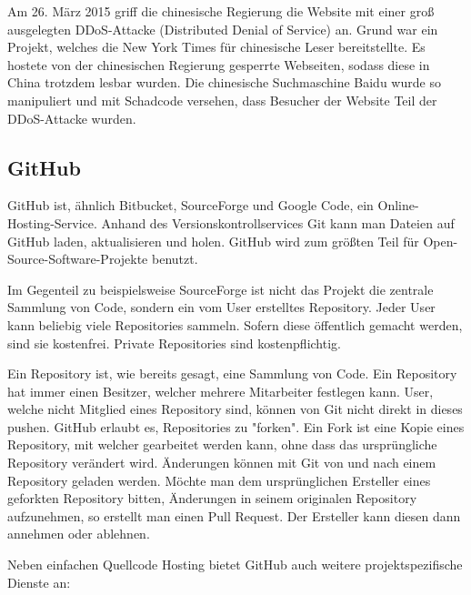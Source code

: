 Am 26. März 2015 griff die chinesische Regierung die Website mit einer groß ausgelegten DDoS-Attacke (Distributed Denial of Service) an. Grund war ein Projekt, welches die New York Times für chinesische Leser bereitstellte. Es hostete von der chinesischen Regierung gesperrte Webseiten, sodass diese in China trotzdem lesbar wurden. Die chinesische Suchmaschine Baidu wurde so manipuliert und mit Schadcode versehen, dass Besucher der Website Teil der DDoS-Attacke wurden.

\subsection{GitHub}
GitHub ist, ähnlich Bitbucket, SourceForge und Google Code, ein Online-Hosting-Service. Anhand des Versionskontrollservices Git kann man Dateien auf GitHub laden, aktualisieren und holen. GitHub wird zum größten Teil für Open-Source-Software-Projekte benutzt.

Im Gegenteil zu beispielsweise SourceForge ist nicht das Projekt die zentrale Sammlung von Code, sondern ein vom User erstelltes Repository. Jeder User kann beliebig viele Repositories sammeln. Sofern diese öffentlich gemacht werden, sind sie kostenfrei. Private Repositories sind kostenpflichtig.

Ein Repository ist, wie bereits gesagt, eine Sammlung von Code. Ein Repository hat immer einen Besitzer, welcher mehrere Mitarbeiter festlegen kann. User, welche nicht Mitglied eines Repository sind, können von Git nicht direkt in dieses pushen. GitHub erlaubt es, Repositories zu "forken". Ein Fork ist eine Kopie eines Repository, mit welcher gearbeitet werden kann, ohne dass das ursprüngliche Repository verändert wird. Änderungen können mit Git von und nach einem Repository geladen werden. Möchte man dem ursprünglichen Ersteller eines geforkten Repository bitten, Änderungen in seinem originalen Repository aufzunehmen, so erstellt man einen Pull Request. Der Ersteller kann diesen dann annehmen oder ablehnen.

Neben einfachen Quellcode Hosting bietet GitHub auch weitere projektspezifische Dienste an:

